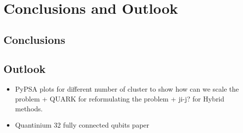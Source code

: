 
\chapter{Conclusions and Outlook} %

\label{Chapter5} %




\section{Conclusions}

\section{Outlook}
\begin{itemize}
    \item PyPSA plots for different number of cluster to show how can we scale the problem + QUARK for reformulating the problem + ji-j? for Hybrid methods.
    \item Quantinium 32 fully connected qubits paper
\end{itemize}
